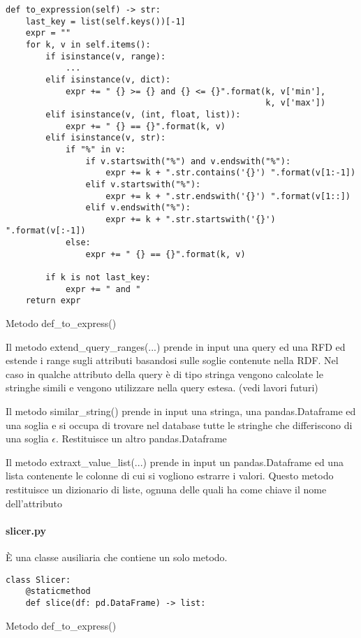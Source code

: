 \begin{listing}[H]
\begin{verbatim}
def to_expression(self) -> str:
    last_key = list(self.keys())[-1]
    expr = ""
    for k, v in self.items():
        if isinstance(v, range):
            ...
        elif isinstance(v, dict):
            expr += " {} >= {} and {} <= {}".format(k, v['min'],
                                                    k, v['max'])
        elif isinstance(v, (int, float, list)):
            expr += " {} == {}".format(k, v)
        elif isinstance(v, str):
            if "%" in v:
                if v.startswith("%") and v.endswith("%"):
                    expr += k + ".str.contains('{}') ".format(v[1:-1])
                elif v.startswith("%"):
                    expr += k + ".str.endswith('{}') ".format(v[1::])
                elif v.endswith("%"):
                    expr += k + ".str.startswith('{}') ".format(v[:-1])
            else:
                expr += " {} == {}".format(k, v)

        if k is not last_key:
            expr += " and "
    return expr
\end{verbatim}
\caption{Metodo def{\_}to{\_}express()}
\label{Code:9}
\end{listing}

Il metodo extend{\_}query{\_}ranges(...) prende in input una query ed una RFD ed estende i range sugli attributi basandosi sulle soglie contenute nella RDF. Nel caso in qualche attributo della query è di tipo stringa vengono calcolate le stringhe simili e vengono utilizzare nella query estesa.
(vedi lavori futuri)

Il metodo similar{\_}string() prende in input una stringa, una pandas.Dataframe ed una soglia e si occupa di trovare nel database tutte le stringhe che differiscono di una soglia $\epsilon$. Restituisce un altro pandas.Dataframe 

Il metodo extraxt{\_}value{\_}list(...) prende in input un pandas.Dataframe ed una lista contenente le colonne di cui si vogliono estrarre i valori. Questo metodo restituisce un dizionario di liste, ognuna delle quali ha come chiave il nome dell'attributo

\paragraph{slicer.py}
È una classe ausiliaria che contiene un solo metodo.
\begin{listing}[H]
\begin{verbatim}
class Slicer:
    @staticmethod
    def slice(df: pd.DataFrame) -> list:
\end{verbatim}
\caption{Metodo def{\_}to{\_}express()}
\label{Code:14}
\end{listing}

